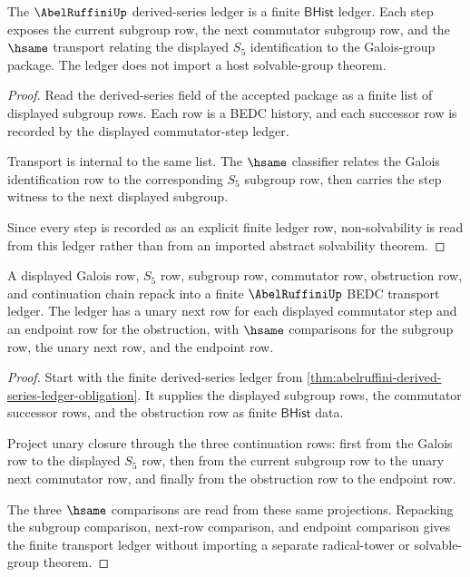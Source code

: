 \begin{theorem}
\label{thm:abelruffini-derived-series-ledger-obligation}
The $\AbelRuffiniUp$ derived-series ledger is a finite $\mathsf{BHist}$ ledger.
Each step exposes the current subgroup row, the next commutator subgroup row,
and the $\hsame$ transport relating the displayed $S_5$ identification to the
Galois-group package. The ledger does not import a host solvable-group theorem.
\end{theorem}
\begin{proof}
Read the derived-series field of the accepted package as a finite list of
displayed subgroup rows. Each row is a BEDC history, and each successor row is
recorded by the displayed commutator-step ledger.

Transport is internal to the same list. The $\hsame$ classifier relates the
Galois identification row to the corresponding $S_5$ subgroup row, then carries
the step witness to the next displayed subgroup.

Since every step is recorded as an explicit finite ledger row, non-solvability is
read from this ledger rather than from an imported abstract solvability theorem.
\end{proof}

\begin{theorem}
\label{thm:abelruffini-derived-series-finite-transport}
A displayed Galois row, $S_5$ row, subgroup row, commutator row,
obstruction row, and continuation chain repack into a finite
$\AbelRuffiniUp$ BEDC transport ledger. The ledger has a unary next row for
each displayed commutator step and an endpoint row for the obstruction, with
$\hsame$ comparisons for the subgroup row, the unary next row, and the
endpoint row.
\end{theorem}
\begin{proof}
Start with the finite derived-series ledger from
\autoref{thm:abelruffini-derived-series-ledger-obligation}. It supplies the
displayed subgroup rows, the commutator successor rows, and the obstruction row
as finite $\mathsf{BHist}$ data.

Project unary closure through the three continuation rows: first from the
Galois row to the displayed $S_5$ row, then from the current subgroup row to
the unary next commutator row, and finally from the obstruction row to the
endpoint row.

The three $\hsame$ comparisons are read from these same projections. Repacking
the subgroup comparison, next-row comparison, and endpoint comparison gives the
finite transport ledger without importing a separate radical-tower or
solvable-group theorem.
\end{proof}


